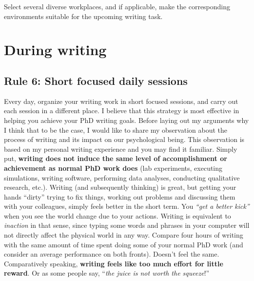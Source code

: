 \documentclass[
  12pt,
  oneside]{book}
\begin{document}
Select several diverse workplaces, and if applicable, make the corresponding environments suitable for the upcoming writing task.

\hypertarget{during}{%
\chapter*{During writing}\label{during}}

\hypertarget{rule6}{%
\section*{\texorpdfstring{\textbf{Rule 6:} Short focused daily sessions}{Rule 6: Short focused daily sessions}}\label{rule6}}

Every day, organize your writing work in short focused sessions, and carry out each session in a different place.
I believe that this strategy is most effective in helping you achieve your PhD writing goals.
Before laying out my arguments why I think that to be the case, I would like to share my observation about the process of writing and its impact on our psychological being.
This observation is based on my personal writing experience and you may find it familiar.
Simply put, \textbf{writing does not induce the same level of accomplishment or achievement as normal PhD work does} (lab experiments, executing simulations, writing software, performing data analyses, conducting qualitative research, etc.).
Writing (and subsequently thinking) is great, but getting your hands ``dirty'' trying to fix things, working out problems and discussing them with your colleagues, simply feels better in the short term.
You \emph{``get a better kick''} when you see the world change due to your actions.
Writing is equivalent to \emph{inaction} in that sense, since typing some words and phrases in your computer will not directly affect the physical world in any way.
Compare four hours of writing with the same amount of time spent doing some of your normal PhD work (and consider an average performance on both fronts).
Doesn't feel the same.
Comparatively speaking, \textbf{writing feels like too much effort for little reward}.
Or as some people say, ``\emph{the juice is not worth the squeeze}!''
\end{document}
